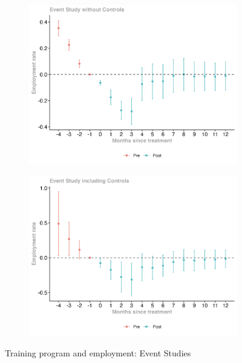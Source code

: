 \documentclass{scrartcl}
\begin{document}
\begin{figure}[h!]
  \begin{subfigure}[t]{0.48\textwidth}
    \centering
    \includegraphics[width=\linewidth]{output/figures/final_event_study_employment_rate.jpg}
    \label{fig:event_study}
  \end{subfigure}
  \hfill
  \begin{subfigure}[t]{0.48\textwidth}
    \centering
    \includegraphics[width=\linewidth]{output/figures/final_event_study_employment_rate_controls.jpg}
    \label{fig:event_study_controls}
  \end{subfigure}

  \caption{Training program and employment: Event Studies}
  \label{fig:event_studies}
\end{figure}
\end{document}
